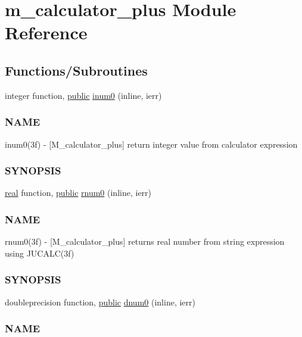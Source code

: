 \hypertarget{namespacem__calculator__plus}{}\section{m\+\_\+calculator\+\_\+plus Module Reference}
\label{namespacem__calculator__plus}
\subsection*{Functions/\+Subroutines}
\begin{DoxyCompactItemize}
\item 
integer function, \hyperlink{M__stopwatch_83_8txt_a2f74811300c361e53b430611a7d1769f}{public} \hyperlink{namespacem__calculator__plus_a3edbf94f311a3fad4a83fd8dfe26a61a}{inum0} (inline, ierr)
\begin{DoxyCompactList}\small\item\em \subsubsection*{N\+A\+ME}

inum0(3f) -\/ \mbox{[}M\+\_\+calculator\+\_\+plus\mbox{]} return integer value from calculator expression \subsubsection*{S\+Y\+N\+O\+P\+S\+IS}\end{DoxyCompactList}\item 
\hyperlink{read__watch_83_8txt_abdb62bde002f38ef75f810d3a905a823}{real} function, \hyperlink{M__stopwatch_83_8txt_a2f74811300c361e53b430611a7d1769f}{public} \hyperlink{namespacem__calculator__plus_a448c42e7171e27c1f4a8e339687b0e3f}{rnum0} (inline, ierr)
\begin{DoxyCompactList}\small\item\em \subsubsection*{N\+A\+ME}

rnum0(3f) -\/ \mbox{[}M\+\_\+calculator\+\_\+plus\mbox{]} returns real number from string expression using J\+U\+C\+A\+L\+C(3f) \subsubsection*{S\+Y\+N\+O\+P\+S\+IS}\end{DoxyCompactList}\item 
doubleprecision function, \hyperlink{M__stopwatch_83_8txt_a2f74811300c361e53b430611a7d1769f}{public} \hyperlink{namespacem__calculator__plus_add45c0bb36bc796ee8a0354665f9397e}{dnum0} (inline, ierr)
\begin{DoxyCompactList}\small\item\em \subsubsection*{N\+A\+ME}


\end{DoxyCompactList}
\end{DoxyCompactItemize}
